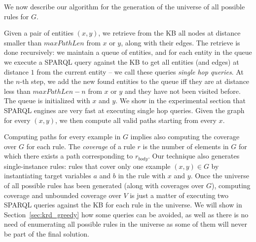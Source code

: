 We now describe our algorithm for the generation of the universe of all possible rules for $G$. 

\vspace{0.5ex}
Given a pair of entities $(x,y)$, we retrieve from the KB all nodes at distance smaller than $maxPathLen$ from $x$ or $y$, along with their edges. The retrieve is done recursively: we maintain a queue of entities, and for each entity in the queue we execute a SPARQL query against the KB to get all entities (and edges) at distance $1$ from the current entity -- we call these queries \emph{single hop queries}. At the $n$-th step, we add the new found entities to the queue iff they are at distance less than $maxPathLen-n$ from $x$ or $y$ and they have not been visited before. The queue is initialized with $x$ and $y$. 
We show in the experimental section that SPARQL engines are very fast at executing single hop queries. %
%
Given the graph for every $(x,y)$, we then compute all valid paths starting from every $x$. 

\vspace{0.5ex}
Computing paths for every example in $G$ implies also computing the coverage over $G$ for each rule. The {\em coverage} of a rule $r$ is the number of elements in $G$ for which there exists a path corresponding to $r_{body}$. 
%
Our technique also generates single-instance rules: rules that cover only one example $(x,y) \in G$ by instantiating target variables $a$ and $b$ in the rule with $x$ and $y$. 
%
Once the universe of all possible rules has been generated (along with coverages over $G$), computing coverage and unbounded coverage over $V$ is just a matter of executing two SPARQL queries against the KB for each rule in the universe. 
We will show in Section~\ref{sec:krd_greedy} how some queries can be avoided, as well as there is no need of enumerating all possible rules in the universe as some of them will never be part of the final solution.

